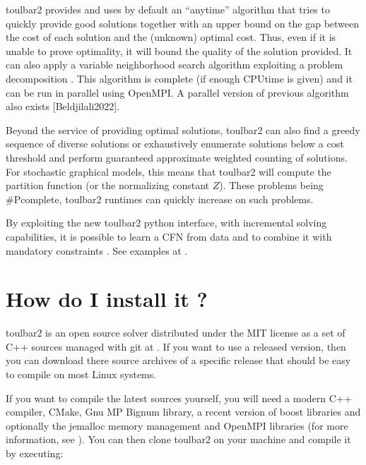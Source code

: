 \documentclass[letterpaper,10pt,openany,oneside,english]{sphinxmanual}
\begin{document}
\sphinxAtStartPar
toulbar2 provides and uses by default an “anytime”
algorithm  that tries to quickly provide good solutions together
with an upper bound on the gap between the cost of each solution and
the (unknown) optimal cost. Thus, even if it is unable to prove
optimality, it will bound the quality of the solution provided.
It can also apply a variable neighborhood search algorithm exploiting a problem decomposition .
This algorithm is complete (if enough CPU\sphinxhyphen{}time is given) and it can be run in parallel using OpenMPI.
A parallel version of previous algorithm also exists {[}Beldjilali2022{]}.

\sphinxAtStartPar
Beyond the service of providing optimal solutions, toulbar2 can also find a greedy sequence of diverse solutions  or
exhaustively enumerate solutions below a cost threshold and
perform guaranteed approximate weighted counting of solutions. For
stochastic graphical models, this means that toulbar2 will compute
the partition function (or the normalizing constant \(Z\)). These
problems being \#P\sphinxhyphen{}complete, toulbar2 runtimes can quickly increase
on such problems.

\sphinxAtStartPar
By exploiting the new toulbar2 python interface, with incremental solving capabilities, it is possible to learn a CFN from data and to combine it with mandatory constraints .
See examples at .


\chapter{How do I install it ?}
\label{\detokenize{userdoc:how-do-i-install-it}}
\sphinxAtStartPar
toulbar2 is an open source solver distributed under the MIT license as a set of C++ sources managed with git at . If you want
to use a released version, then you can download there source archives of a specific release that should be easy to compile on most Linux systems.

\sphinxAtStartPar
If you want to compile the latest sources yourself, you will need a modern C++ compiler, CMake, Gnu MP Bignum library, a recent version of boost libraries and optionally the jemalloc memory management and OpenMPI libraries (for more information, see ). You can then clone toulbar2 on your machine and compile it by executing:
\end{document}
